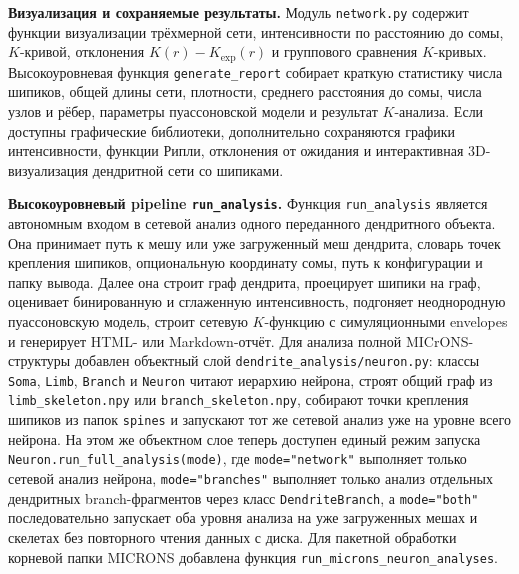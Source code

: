 \documentclass[12pt,a4paper]{article}
\begin{document}
\noindent\textbf{Визуализация и сохраняемые результаты.}
Модуль \texttt{network.py} содержит функции визуализации трёхмерной сети, интенсивности по расстоянию до сомы, \(K\)-кривой, отклонения \(K(r)-K_{\mathrm{exp}}(r)\) и группового сравнения \(K\)-кривых. Высокоуровневая функция \texttt{generate\_report} собирает краткую статистику числа шипиков, общей длины сети, плотности, среднего расстояния до сомы, числа узлов и рёбер, параметры пуассоновской модели и результат \(K\)-анализа. Если доступны графические библиотеки, дополнительно сохраняются графики интенсивности, функции Рипли, отклонения от ожидания и интерактивная 3D-визуализация дендритной сети со шипиками.

\noindent\textbf{Высокоуровневый pipeline \texttt{run\_analysis}.}
Функция \texttt{run\_analysis} является автономным входом в сетевой анализ одного переданного дендритного объекта. Она принимает путь к мешу или уже загруженный меш дендрита, словарь точек крепления шипиков, опциональную координату сомы, путь к конфигурации и папку вывода. Далее она строит граф дендрита, проецирует шипики на граф, оценивает бинированную и сглаженную интенсивность, подгоняет неоднородную пуассоновскую модель, строит сетевую \(K\)-функцию с симуляционными envelopes и генерирует HTML- или Markdown-отчёт. Для анализа полной MICrONS-структуры добавлен объектный слой \texttt{dendrite\_analysis/neuron.py}: классы \texttt{Soma}, \texttt{Limb}, \texttt{Branch} и \texttt{Neuron} читают иерархию нейрона, строят общий граф из \texttt{limb\_skeleton.npy} или \texttt{branch\_skeleton.npy}, собирают точки крепления шипиков из папок \texttt{spines} и запускают тот же сетевой анализ уже на уровне всего нейрона. На этом же объектном слое теперь доступен единый режим запуска \texttt{Neuron.run\_full\_analysis(mode)}, где \texttt{mode="network"} выполняет только сетевой анализ нейрона, \texttt{mode="branches"} выполняет только анализ отдельных дендритных branch-фрагментов через класс \texttt{DendriteBranch}, а \texttt{mode="both"} последовательно запускает оба уровня анализа на уже загруженных мешах и скелетах без повторного чтения данных с диска. Для пакетной обработки корневой папки MICRONS добавлена функция \texttt{run\_microns\_neuron\_analyses}.
\end{document}
